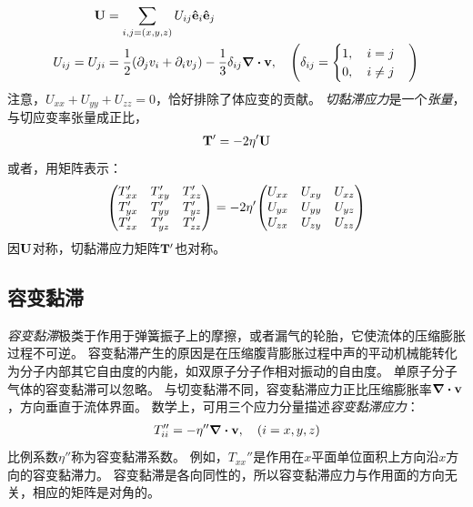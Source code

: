 \documentclass[UTF8]{ctexbook}
\begin{document}
\begin{align*}
	\vb{U} & = \sum_{i,j=(x,y,z)}U_{ij} \vu{e}_i \vu{e}_j\\
	U_{ij} = U_{ji} &= \frac12 \qty(\partial_j v_i + \partial_i v_j) - \frac13 \delta_{ij} \div \vb{v}\qc \qty(\delta_{ij} = \begin{cases}1\qc i=j \\ 0\qc i\neq j\end{cases})
\end{align*}
注意，$U_{xx}+U_{yy}+U_{zz}=0$，恰好排除了体应变的贡献。
\emph{切黏滞应力}是一个\emph{张量}，与切应变率张量成正比，
\begin{align}
	\vb{T}' = -2\eta' \vb{U}
	\label{eq:fundamental_shear}
\end{align}
或者，用矩阵表示：
$$ 
\mqty( T_{xx}' & T_{xy}' & T_{xz}' \\
T_{yx}' & T_{yy}' & T_{yz}' \\
T_{zx}' & T_{yz}' & T_{zz}')
=-2\eta'
\mqty(
U_{xx} & U_{xy} & U_{xz}\\
U_{yx} & U_{yy}& U_{yz}\\
U_{zx} & U_{zy} & U_{zz})$$
 因$\vb{U}$对称，切黏滞应力矩阵$\vb{T}'$也对称。


\subsection{容变黏滞}
\emph{容变黏滞}极类于作用于弹簧振子上的摩擦，或者漏气的轮胎，它使流体的压缩膨胀过程不可逆。
容变黏滞产生的原因是在压缩腹背膨胀过程中声的平动机械能转化为分子内部其它自由度的内能，如双原子分子作相对振动的自由度。
单原子分子气体的容变黏滞可以忽略。
与切变黏滞不同，容变黏滞应力正比压缩膨胀率$\div \vb{v}$，方向垂直于流体界面。
数学上，可用三个应力分量描述\emph{容变黏滞应力}：
\begin{align}
	T_{ii}'' = -\eta'' \div \vb{v} \qc \qty(i  = x,y,z)
	\label{eq:fundamental_bulk}
\end{align}
比例系数$\eta''$称为容变黏滞系数。
例如，$T_{xx}''$是作用在$x$平面单位面积上方向沿$x$方向的容变黏滞力。
容变黏滞是各向同性的，所以容变黏滞应力与作用面的方向无关，相应的矩阵是对角的。
\end{document}
